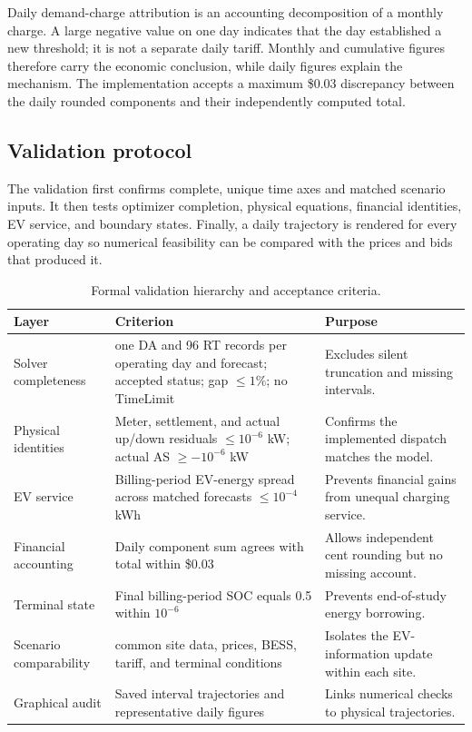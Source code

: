 \documentclass[final,5p,times]{elsarticle}
\begin{document}
Daily demand-charge attribution is an accounting decomposition of a monthly charge. A large negative value on one day indicates that the day established a new threshold; it is not a separate daily tariff. Monthly and cumulative figures therefore carry the economic conclusion, while daily figures explain the mechanism. The implementation accepts a maximum \$0.03 discrepancy between the daily rounded components and their independently computed total.

\subsection{Validation protocol}
The validation first confirms complete, unique time axes and matched scenario
inputs. It then tests optimizer completion, physical equations, financial
identities, EV service, and boundary states. Finally, a daily trajectory is
rendered for every operating day so numerical feasibility can be compared with
the prices and bids that produced it.

\begin{table}[!t]
\centering
\caption{Formal validation hierarchy and acceptance criteria.}
\label{tab:validation_protocol}
\scriptsize
\begin{tabularx}{\textwidth}{@{}p{}p{}X@{}}
\toprule
Layer & Criterion & Purpose \\
\midrule
Solver completeness & one DA and 96 RT records per operating day and forecast; accepted status; gap $\le1\%$; no TimeLimit & Excludes silent truncation and missing intervals.\\
Physical identities & Meter, settlement, and actual up/down residuals $\le10^{-6}$ kW; actual AS $\ge-10^{-6}$ kW & Confirms the implemented dispatch matches the model.\\
EV service & Billing-period EV-energy spread across matched forecasts $\le10^{-4}$ kWh & Prevents financial gains from unequal charging service.\\
Financial accounting & Daily component sum agrees with total within \$0.03 & Allows independent cent rounding but no missing account.\\
Terminal state & Final billing-period SOC equals 0.5 within $10^{-6}$ & Prevents end-of-study energy borrowing.\\
Scenario comparability & common site data, prices, BESS, tariff, and terminal conditions & Isolates the EV-information update within each site.\\
Graphical audit & Saved interval trajectories and representative daily figures & Links numerical checks to physical trajectories.\\
\bottomrule
\end{tabularx}
\end{table}
\end{document}

